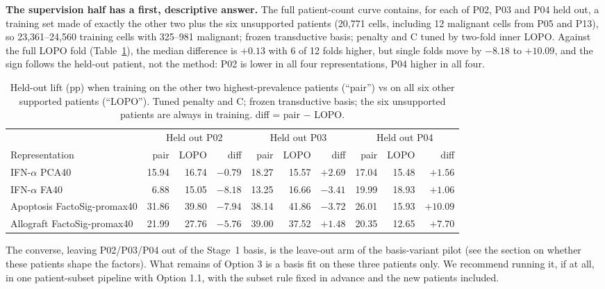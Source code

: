\textbf{The supervision half has a first, descriptive answer.} The full patient-count curve contains, for each of P02, P03 and P04 held out, a training set made of exactly the other two plus the six unsupported patients (20,771 cells, including 12 malignant cells from P05 and P13), so 23,361--24,560 training cells with 325--981 malignant; frozen transductive basis; penalty and C tuned by two-fold inner LOPO. Against the full LOPO fold (Table~\ref{tab:09opt3}), the median difference is $+0.13$\pp{} with 6 of 12 folds higher, but single folds move by $-8.18$ to $+10.09$\pp, and the sign follows the held-out patient, not the method: P02 is lower in all four representations, P04 higher in all four.

\begin{table}[H]
\centering
\small
\caption{Held-out lift (pp) when training on the other two highest-prevalence patients (``pair'') vs on all six other supported patients (``LOPO''). Tuned penalty and C; frozen transductive basis; the six unsupported patients are always in training. diff = pair $-$ LOPO.}
\label{tab:09opt3}
\setlength{\tabcolsep}{3.6pt}
\begin{tabular}{l rrr rrr rrr}
\toprule
 & \multicolumn{3}{c}{Held out P02} & \multicolumn{3}{c}{Held out P03} & \multicolumn{3}{c}{Held out P04} \\
\cmidrule(lr){2-4}\cmidrule(lr){5-7}\cmidrule(lr){8-10}
Representation & pair & LOPO & diff & pair & LOPO & diff & pair & LOPO & diff \\
\midrule
IFN-$\alpha$ PCA40 & 15.94 & 16.74 & $-0.79$ & 18.27 & 15.57 & $+2.69$ & 17.04 & 15.48 & $+1.56$ \\
IFN-$\alpha$ FA40 & 6.88 & 15.05 & $-8.18$ & 13.25 & 16.66 & $-3.41$ & 19.99 & 18.93 & $+1.06$ \\
Apoptosis FactoSig-promax40 & 31.86 & 39.80 & $-7.94$ & 38.14 & 41.86 & $-3.72$ & 26.01 & 15.93 & $+10.09$ \\
Allograft FactoSig-promax40 & 21.99 & 27.76 & $-5.76$ & 39.00 & 37.52 & $+1.48$ & 20.35 & 12.65 & $+7.70$ \\
\bottomrule
\end{tabular}
\end{table}

The converse, leaving P02/P03/P04 out of the Stage~1 basis, is the leave-out arm of the basis-variant pilot (see the section on whether these patients shape the factors). What remains of Option 3 is a basis fit on these three patients only. We recommend running it, if at all, in one patient-subset pipeline with Option 1.1, with the subset rule fixed in advance and the new patients included.

